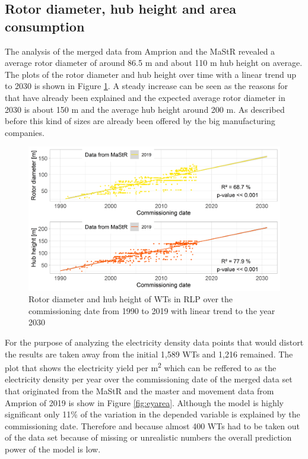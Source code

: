 \documentclass[a4paper,11pt]{article}
\begin{document}
\newpage

\hypertarget{rotor-diameter-hub-height-and-area-consumption}{%
\subsection{Rotor diameter, hub height and area consumption}\label{rotor-diameter-hub-height-and-area-consumption}}

The analysis of the merged data from Amprion and the MaStR revealed a average rotor diameter of around 86.5 m and about 110 m hub height on average. The plots of the rotor diameter and hub height over time with a linear trend up to 2030 is shown in Figure \ref{fig:rotorhub}. A steady increase can be seen as the reasons for that have already been explained and the expected average rotor diameter in 2030 is about 150 m and the average hub height around 200 m. As described before this kind of sizes are already been offered by the big manufacturing companies.
\begin{figure}[H]

{\centering \includegraphics[width=1\linewidth]{data/MaStR_amprion_analysis/results_of_analysis/rotor_diameter_hub_height} 

}

\caption{Rotor diameter and hub height of WTs in RLP over the commissioning date from 1990 to 2019 with linear trend to the year 2030}\label{fig:rotorhub}
\end{figure}
For the purpose of analyzing the electricity density data points that would distort the results are taken away from the initial 1,589 WTs and 1,216 remained. The plot that shows the electricity yield per m\textsuperscript{2} which can be reffered to as the electricity density per year over the commissioning date of the merged data set that originated from the MaStR and the master and movement data from Amprion of 2019 is show in Figure \ref{fig:eyarea}. Although the model is highly significant only 11\% of the variation in the depended variable is explained by the commissioning date. Therefore and because almost 400 WTs had to be taken out of the data set because of missing or unrealistic numbers the overall prediction power of the model is low.
\end{document}
